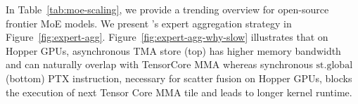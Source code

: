


In Table~\ref{tab:moe-scaling}, we provide a trending overview for open-source frontier MoE models. We present \Algname's expert aggregation strategy in Figure~\ref{fig:expert-agg}. Figure~\ref{fig:expert-agg-why-slow} illustrates that on Hopper GPUs, asynchronous TMA store (top) has higher memory bandwidth and can naturally overlap with TensorCore MMA whereas synchronous $\mathrm{st.global}$ (bottom) PTX instruction, necessary for scatter fusion on Hopper GPUs, blocks the execution of next Tensor Core MMA tile and leads to longer kernel runtime.






